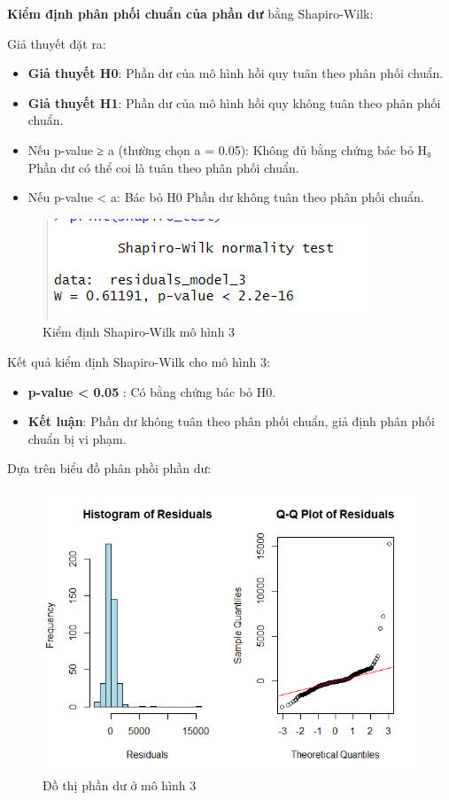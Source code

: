 \textbf{Kiểm định phân phối chuẩn của phần dư} bằng Shapiro-Wilk:

Giả thuyết đặt ra:
\begin{itemize}
  \item\textbf{Giả thuyết H0}: Phần dư của mô hình hồi quy tuân theo phân phối chuẩn.
  \item\textbf{Giả thuyết H1}: Phần dư của mô hình hồi quy không tuân theo phân phối chuẩn.
  \item Nếu p-value ≥ a (thường chọn a = 0.05): Không đủ bằng chứng bác bỏ H₀ \rightarrow Phần dư có thể coi là tuân theo phân phối chuẩn.
  \item Nếu p-value < a: Bác bỏ H0 \rightarrow Phần dư không tuân theo phân phối chuẩn.
\end{itemize}

\begin{figure}[H]
  \centering
  \includegraphics[width=0.7\linewidth]{graphics/5.5.6.png}
  \caption{Kiểm định Shapiro-Wilk mô hình 3 }
\end{figure}

Kết quả kiểm định Shapiro-Wilk cho mô hình 3:
\begin{itemize}
  \item\textbf{p-value < 0.05 }: Có bằng chứng bác bỏ H0.
  \item\textbf{Kết luận}: Phần dư không tuân theo phân phối chuẩn, giả định phân phối chuẩn bị vi phạm.
\end{itemize}

Dựa trên biểu đồ phân phồi phần dư:
\begin{figure}[H]
  \centering
  \includegraphics[width=0.5\linewidth]{graphics/5.5.9.png}
  \caption{Đồ thị phần dư ở mô hình 3}
\end{figure}

